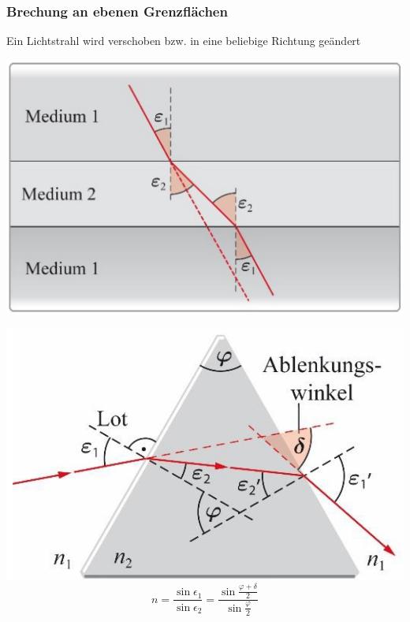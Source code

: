 

\subsubsection{Brechung an ebenen Grenzflächen}

Ein Lichtstrahl wird verschoben bzw. in eine beliebige Richtung geändert\\


\begin{minipage}{0.4\linewidth}
\includegraphics[width=\linewidth]{Bilder/Wellen-Optik/verschiebung_lichtstrahl} 
\end{minipage}
\hfill
\begin{minipage}{0.4\linewidth}
\includegraphics[width=\linewidth]{Bilder/Wellen-Optik/prisma} 
$$\boxed{n = \frac{\sin{\epsilon_1}}{\sin{\epsilon_2}} = \frac{\sin{\frac{\varphi + \delta}{2}}}{\sin{\frac{\varphi}{2}}}}$$
\end{minipage}



